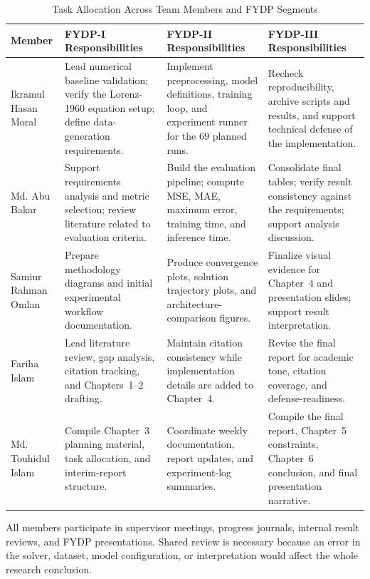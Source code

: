 \begin{table}[H]
\centering
\caption{Task Allocation Across Team Members and FYDP Segments}
\label{tab:tasks}
\scriptsize
\renewcommand{\arraystretch}{1.2}
\begin{tabularx}{\textwidth}{|p{2.4cm}|>{\raggedright\arraybackslash}X|>{\raggedright\arraybackslash}X|>{\raggedright\arraybackslash}X|}
\hline
\textbf{Member} & \textbf{FYDP-I Responsibilities} & \textbf{FYDP-II Responsibilities} & \textbf{FYDP-III Responsibilities} \\
\hline
Ikramul Hasan Moral & Lead numerical baseline validation; verify the Lorenz-1960 equation setup; define data-generation requirements. & Implement preprocessing, model definitions, training loop, and experiment runner for the $69$ planned runs. & Recheck reproducibility, archive scripts and results, and support technical defense of the implementation. \\
\hline
Md. Abu Bakar & Support requirements analysis and metric selection; review literature related to evaluation criteria. & Build the evaluation pipeline; compute MSE, MAE, maximum error, training time, and inference time. & Consolidate final tables; verify result consistency against the requirements; support analysis discussion. \\
\hline
Samiur Rahman Omlan & Prepare methodology diagrams and initial experimental workflow documentation. & Produce convergence plots, solution trajectory plots, and architecture-comparison figures. & Finalize visual evidence for Chapter~4 and presentation slides; support result interpretation. \\
\hline
Fariha Islam & Lead literature review, gap analysis, citation tracking, and Chapters~1--2 drafting. & Maintain citation consistency while implementation details are added to Chapter~4. & Revise the final report for academic tone, citation coverage, and defense-readiness. \\
\hline
Md. Touhidul Islam & Compile Chapter~3 planning material, task allocation, and interim-report structure. & Coordinate weekly documentation, report updates, and experiment-log summaries. & Compile the final report, Chapter~5 constraints, Chapter~6 conclusion, and final presentation narrative. \\
\hline
\end{tabularx}
\end{table}

All members participate in supervisor meetings, progress journals, internal result reviews, and FYDP presentations. Shared review is necessary because an error in the solver, dataset, model configuration, or interpretation would affect the whole research conclusion.

